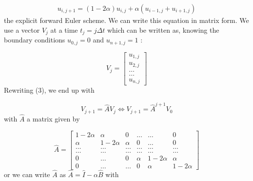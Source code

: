 \documentclass[a4paper, twoside, 11pt]{report}
\theoremstyle{theorem}
\theoremstyle{remark}
\theoremstyle{exemple}
\begin{document}
                    \begin{align*}
                        u_{i,j+1}=(1-2\alpha)u_{i,j}+\alpha(u_{i-1,j}+u_{i+1,j})
                        \tag{3}
                    \end{align*}
                    the explicit forward Euler scheme. We can write this equation in matrix form. We use a vector $V_j$ at a time $t_j=j\Delta t$ which can be written as, knowing the boundary conditions $u_{0,j} = 0$ and $u_{n+1,j} = 1$ :

                    \begin{equation*}
                        V_j = \left[\begin{matrix}
                                        u_{1,j} \\
                                        u_{2,j} \\
                                        \dots \\
                                        \dots \\
                                        u_{n,j}
                                    \end{matrix}\right]
                    \end{equation*}
                    Rewriting (3), we end up with

                    \begin{equation*}
                        V_{j+1}= \hat{A} V_j \Longleftrightarrow V_{j+1} = \hat{A}^{j+1}V_0
                    \end{equation*}
                    with $\hat{A}$ a matrix given by

                    \begin{equation*}
                        \hat{A} = \left[\begin{matrix}
                                          1-2\alpha & \alpha & 0 & \dots & \dots & 0\\
                                          \alpha & 1-2\alpha & \alpha & 0 & \dots & 0 \\
                                          \dots & \dots & \dots & \dots & \dots & \dots\\
                                          \dots & \dots & \dots & \dots & \dots & \dots\\
                                          0 & \dots & 0 & \alpha & 1-2\alpha & \alpha \\
                                          0 & \dots & \dots & 0 & \alpha & 1-2\alpha
                                        \end{matrix} \right]
                    \end{equation*}
                    or we can write $\hat{A}$ as $\hat{A}=\hat{I}- \alpha \hat{B}$ with
\end{document}
